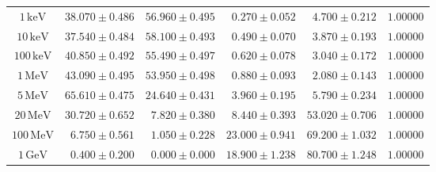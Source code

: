 \begin{tabular}{crrrrr}
\midrule
$1\,\mathrm{keV}$ & $38.070\pm0.486$ & $56.960\pm0.495$ & $0.270\pm0.052$ & $4.700\pm0.212$ & $1.00000$ \\
$10\,\mathrm{keV}$ & $37.540\pm0.484$ & $58.100\pm0.493$ & $0.490\pm0.070$ & $3.870\pm0.193$ & $1.00000$ \\
$100\,\mathrm{keV}$ & $40.850\pm0.492$ & $55.490\pm0.497$ & $0.620\pm0.078$ & $3.040\pm0.172$ & $1.00000$ \\
$1\,\mathrm{MeV}$ & $43.090\pm0.495$ & $53.950\pm0.498$ & $0.880\pm0.093$ & $2.080\pm0.143$ & $1.00000$ \\
$5\,\mathrm{MeV}$ & $65.610\pm0.475$ & $24.640\pm0.431$ & $3.960\pm0.195$ & $5.790\pm0.234$ & $1.00000$ \\
$20\,\mathrm{MeV}$ & $30.720\pm0.652$ & $7.820\pm0.380$ & $8.440\pm0.393$ & $53.020\pm0.706$ & $1.00000$ \\
$100\,\mathrm{MeV}$ & $6.750\pm0.561$ & $1.050\pm0.228$ & $23.000\pm0.941$ & $69.200\pm1.032$ & $1.00000$ \\
$1\,\mathrm{GeV}$ & $0.400\pm0.200$ & $0.000\pm0.000$ & $18.900\pm1.238$ & $80.700\pm1.248$ & $1.00000$ \\
\bottomrule
\end{tabular}
